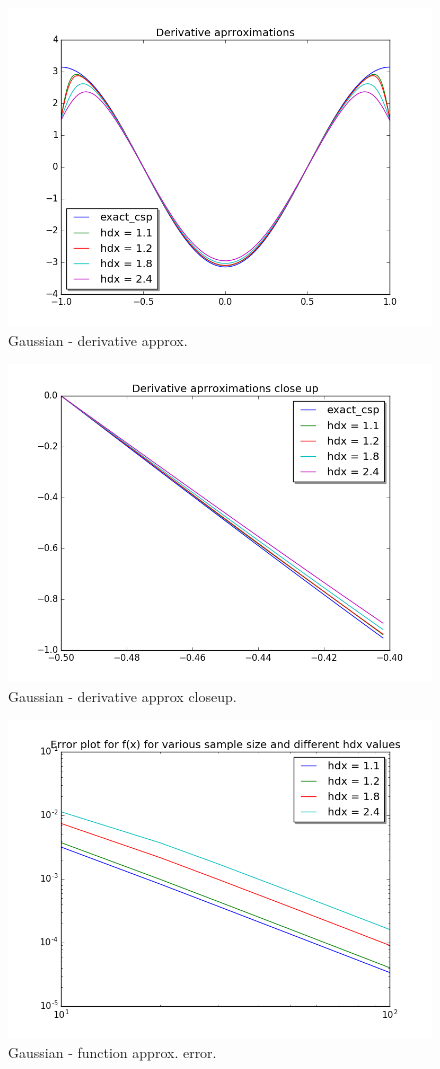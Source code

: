 \documentclass[a4paper,11pt]{article}
\begin{document}
\begin{figure}[ht]
    \centering
    \includegraphics[width=.8\linewidth]{derv_gau.png}
    \caption{Gaussian - derivative approx.}
    \label{fig:ex7}    
\end{figure}
\begin{figure}[ht]
    \centering
    \includegraphics[width=.8\linewidth]{derv_gau_clup.png}
    \caption{Gaussian - derivative approx closeup.}
    \label{fig:ex8}    
\end{figure}

\begin{figure}[ht]
    \centering
    \includegraphics[width=.8\linewidth]{fun_err_gau.png}
    \caption{Gaussian - function approx. error.}
    \label{fig:ex9}    
\end{figure}
\end{document}
